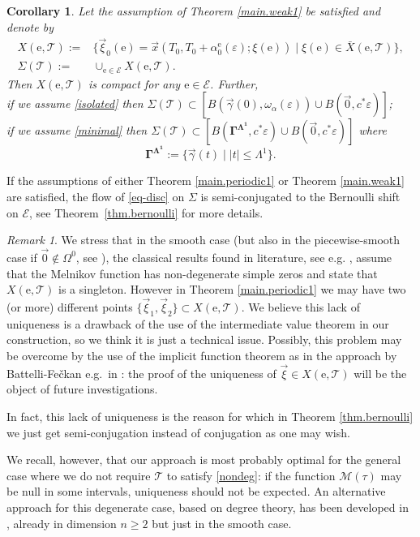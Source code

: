 \documentclass[10pt]{article}
\numberwithin{equation}{section}
\def\al{\alpha}
\def\ga{\vec{\gamma}}
\def\ep{\varepsilon}
\def\ee{{\mathrm e}}
\def\EE{{\mathcal E}}
\def\MM{{\mathcal M}}
\def\TT{{\mathcal T}}
\def\l1{\Lambda^{1}}
\def\xxi{\vec{\xi}}
\def\x{\vec{x}}
\newcommand\bs[1]{{\boldsymbol{#1}}}
\newtheorem{cor}[theorem]{Corollary}
\theoremstyle{definition}
\theoremstyle{remark}
\newtheorem{remark}[theorem]{Remark}
\begin{document}
\begin{cor}\label{c.sigma}
  Let the assumption of Theorem \ref{main.weak1} be satisfied and denote by
  \begin{equation}\label{defX}
  \begin{split}
       X(\ee,\TT):= & \{ \xxi_0(\ee)=\x(T_0, T_0+ \alpha_{0}^{\ee}(\ep); \xi(\ee)) \mid \xi(\ee) \in \bar{X}(\ee, \TT) \}, \\
        \Sigma(\TT):= & \cup_{\ee \in \EE} X(\ee, \TT).
  \end{split}
  \end{equation}
  Then $X(\ee,\TT)$ is compact for any $\ee \in \EE$.
Further,\\
if we assume \eqref{isolated} then
$\Sigma(\TT) \subset [B(\ga(0), \omega_{\al}(\ep)) \cup B(\vec{0}, c^* \ep)]$;
\\ if we assume \eqref{minimal} then
$\Sigma(\TT) \subset [B(\bs{\Gamma^{\l1}}, c^* \ep) \cup B(\vec{0}, c^* \ep)]$
where
\begin{equation}\label{ga1}
	\bs{\Gamma^{\l1}}:= \{ \ga(t) \mid |t| \le \l1     \}.
\end{equation}
\end{cor}


 If the assumptions of either Theorem \ref{main.periodic1} or Theorem \ref{main.weak1} are satisfied, the flow of \eqref{eq-disc} on $\Sigma$   is semi-conjugated to the Bernoulli shift on $\EE$, see Theorem~\ref{thm.bernoulli}   for more details.

\begin{remark}\label{r.nonunique}
 We stress that in the smooth case (but also in the piecewise-smooth case if $\vec{0} \not\in \Omega^0$, see \cite{BF11}), the
classical results found in literature, see e.g. \cite{G1,Pa84,Sch,WigBook,St},
 assume  that  the Melnikov function  has non-degenerate simple zeros and  state that
$X(\ee, \TT)$ is a singleton.
%
However
 in Theorem  \ref{main.periodic1}  we may have two (or more) different points $\{\xxi_1,  \xxi_2\}\subset X(\ee,\mathcal{T})$.
  We believe this lack of uniqueness is a drawback of the use of
the intermediate value theorem
in our construction, so we think it is just a technical issue.
 Possibly, this problem may be overcome by the use  of the implicit function theorem
as in the approach by Battelli-Fe\v ckan e.g.\ in \cite{BF10,BF11,BF12}: the proof of the uniqueness of $\xxi \in  X(\ee, \TT)$ will be
the object
of future investigations.

In fact, this lack of uniqueness is the reason for which in Theorem \ref{thm.bernoulli} we just get
semi-conjugation
 instead of conjugation as one may wish.

 We recall, however, that our approach is most probably optimal for the general case where we do not require $\mathcal{T}$ to satisfy
 \eqref{nondeg}:
 if the function $\MM(\tau)$ may be null in some intervals, uniqueness should not be expected. An alternative approach for this degenerate
 case, based on degree theory,
 has been developed in \cite{BF02C}, already in dimension $n \ge 2$ but just in the smooth case.
\end{remark}
\end{document}
